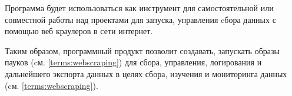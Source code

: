 Программа будет использоваться как инструмент для самостоятельной или совместной работы над проектами для запуска, управления cбора данных с помощью веб краулеров в сети интернет. 


Таким образом, программный продукт позволит создавать, запускать образы пауков (cм. \ref{terms:webscraping}) для сбора, управления, логирования и дальнейшего экспорта данных в целях сбора, изучения и мониторинга данных (cм. \ref{terms:webscraping}). 
